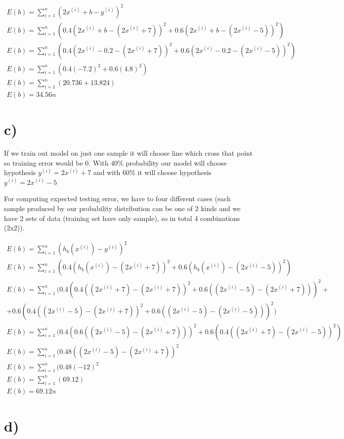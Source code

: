 \documentclass[a4paper]{article}
\begin{document}
\begin{align*}
	E(b)=\sum_{i=1}^{n}(2x^{(i)}+b - y^{(i)})^2 
	\\
	E(b)=\sum_{i=1}^{n}(0.4(2x^{(i)} + b - (2x^{(i)}+7))^2 + 0.6(2x^{(i)} + b - (2x^{(i)}-5))^2)
	\\
	E(b)=\sum_{i=1}^{n}(0.4(2x^{(i)} - 0.2 - (2x^{(i)}+7))^2 + 0.6(2x^{(i)} - 0.2 - (2x^{(i)}-5))^2)
	\\
	E(b)=\sum_{i=1}^{n}(0.4(-7.2)^2 + 0.6(4.8)^2)
	\\
	E(b)=\sum_{i=1}^{n}(20.736 + 13.824)
	\\
	E(b) = 34.56n
\end{align*} 

\section{c)}

If we train out model on just one sample it will choose line which cross that point so training error would be $0$. With $40\%$ probability our model will choose hypothesis $y^{(i)}= 2x^{(i)}+7$ and with $60\%$ it will choose hypothesis $y^{(i)}= 2x^{(i)}-5$

For computing expected testing error, we have to four different cases (each sample produced by our probability distribution can be one of 2 kinds and we have 2 sets of data (training set have only sample), so in total 4 combinations (2x2)).

\begin{align*}
	E(b)=\sum_{i=1}^{n}(h_b(x^{(i)}) - y^{(i)})^2 
	\\
	E(b)=\sum_{i=1}^{n}(0.4(h_b(x^{(i)}) - (2x^{(i)}+7))^2 + 0.6(h_b(x^{(i)}) - (2x^{(i)}-5))^2)
	\\
	E(b)=\sum_{i=1}^{n}(0.4(0.4((2x^{(i)}+7) - (2x^{(i)}+7))^2 + 0.6((2x^{(i)}-5) - (2x^{(i)}+7)))^2 +
	\\ 
	+ 0.6(0.4((2x^{(i)}-5) - (2x^{(i)}+7))^2 + 0.6((2x^{(i)}-5) - (2x^{(i)}-5)))^2)
	\\
	E(b)=\sum_{i=1}^{n}(0.4(0.6((2x^{(i)}-5) - (2x^{(i)}+7)))^2 
	+0.6(0.4((2x^{(i)}+7) - (2x^{(i)}-5))^2)
	\\
	E(b)=\sum_{i=1}^{n}(0.48((2x^{(i)}-5) - (2x^{(i)}+7))^2
	\\
	E(b)=\sum_{i=1}^{n}(0.48(-12)^2
	\\
	E(b)=\sum_{i=1}^{n}(69.12)
	\\
	E(b) = 69.12n
\end{align*} 

\section{d)}
\end{document}
